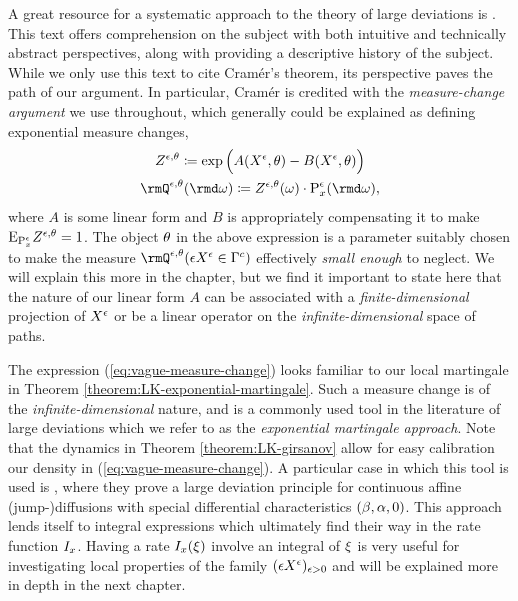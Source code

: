 A great resource for a systematic approach to the theory of large deviations is \cite{dembo2010}.
This text offers comprehension on the subject with both intuitive and technically abstract perspectives, along with providing a descriptive history of the subject.
While we only use this text to cite Cram\'er's theorem, its perspective paves the path of our argument.
In particular, Cram\'er is credited with the \emph{measure-change argument} we use throughout, which generally could be explained as defining exponential measure changes,
\begin{gather}
  \label{eq:vague-measure-change}
  \mgDensity^{\epsilon,\twistVar} \defeq \exp\Big( A(\Xee, \twistVar) - B(\Xee, \twistVar) \Big) \\
  \notag
  \mgPrb^{\epsilon,\twistVar}(\rmd\omega) \defeq \mgDensity^{\epsilon,\twistVar}(\omega) \cdot \Prb^\epsilon_\stateVar(\rmd\omega),
\end{gather}
where $A$ is some linear form and $B$ is appropriately compensating it to make ${\operatorname{E}}_{{\operatorname{P}}^\epsilon_x}Z^{\epsilon,\theta} = 1$.
The object $\theta$ in the above expression is a parameter suitably chosen to make the measure $\mgPrb^{\epsilon,\twistVar}(\Xe \in \Gamma^c)$ effectively \emph{small enough} to neglect.
We will explain this more in the chapter, but we find it important to state here that the nature of our linear form $A$ can be associated with a \emph{finite-dimensional} projection of $X^\epsilon$ or be a linear operator on the \emph{infinite-dimensional} space of paths.

The expression (\ref{eq:vague-measure-change}) looks familiar to our local martingale in Theorem \ref{theorem:LK-exponential-martingale}.
Such a measure change is of the \emph{infinite-dimensional} nature, and is a commonly used tool in the literature of large deviations which we refer to as the \emph{exponential martingale approach}.
Note that the dynamics in Theorem \ref{theorem:LK-girsanov} allow for easy calibration our density in (\ref{eq:vague-measure-change}).
A particular case in which this tool is used is \cite{kang2014}, where they prove a large deviation principle for continuous affine (jump-)diffusions with special differential characteristics $(\beta, \alpha, 0)$.
This approach lends itself to integral expressions which ultimately find their way in the rate function $I_x$.
Having a rate $I_x(\xi)$ involve an integral of $\xi$ is very useful for investigating local properties of the family $(\epsilon X^\epsilon)_{\epsilon>0}$ and will be explained more in depth in the next chapter.

